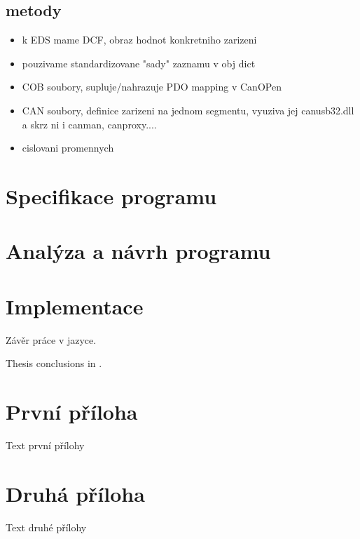 \documentclass[
  field=ainfk,
  biblatex,
  glossaries,
  index
]{kidiplom}
\begin{document}
\subsection{metody}

\begin{itemize}
    \item k EDS mame DCF, obraz hodnot konkretniho zarizeni 
    \item pouzivame standardizovane "sady" zaznamu v obj dict
    \item COB soubory, supluje/nahrazuje PDO mapping v CanOPen
    \item CAN soubory, definice zarizeni na jednom segmentu, vyuziva jej canusb32.dll a skrz ni i canman, canproxy.... 
    \item cislovani promennych
\end{itemize}

\section{Specifikace programu}

\section{Analýza a návrh programu}

\section{Implementace}

\begin{kiconclusions}
Závěr práce v  jazyce.
\end{kiconclusions}

\begin{kiconclusions}[english]
Thesis conclusions in .
\end{kiconclusions}

\appendix

\section{První příloha}
Text první přílohy

\section{Druhá příloha}
Text druhé přílohy
\end{document}
